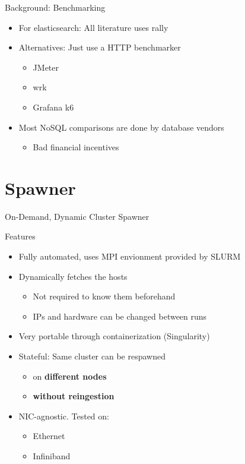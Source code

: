 \documentclass[compress,aspectratio=169]{beamer}
\begin{document}
  \begin{frame}{Background: Benchmarking}
    \begin{itemize}
      \item For elasticsearch: All literature uses rally \cite{rallyusecase1} \cite{rallyusecase2} \cite{rallyusecase3}
      \item Alternatives: Just use a HTTP benchmarker
        \begin{itemize}
          \item JMeter \cite{jmeter}
          \item wrk \cite{wrk}
          \item Grafana k6 \cite{k6}
        \end{itemize}
      \item Most NoSQL comparisons are done by database vendors \cite{tsbs}
        \begin{itemize}
          \item Bad financial incentives
        \end{itemize}
    \end{itemize}
  \end{frame}

	\section{Spawner}
	\begin{frame}{On-Demand, Dynamic Cluster Spawner}
    \begin{block}{Features}
      \pause
      \begin{itemize}
        \item Fully automated, uses MPI envionment provided by SLURM
          \pause
        \item Dynamically fetches the hosts
          \begin{itemize}
            \item Not required to know them beforehand
            \item IPs and hardware can be changed between runs
          \end{itemize}
          \pause
        \item Very portable through containerization (Singularity)
          \pause
        \item Stateful: Same cluster can be respawned 
          \begin{itemize}
            \item on \textbf{different nodes}
            \item \textbf{without reingestion}
          \end{itemize}
          \pause
        \item NIC-agnostic. Tested on:
          \begin{itemize}
            \item Ethernet
            \item Infiniband
          \end{itemize}
      \end{itemize}
    \end{block}
	\end{frame}
\end{document}
